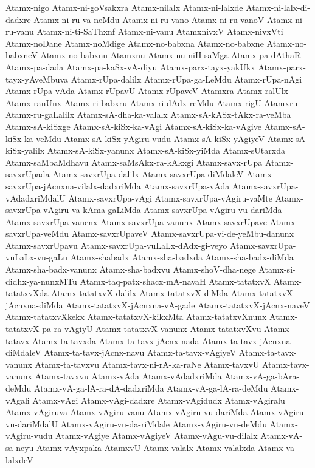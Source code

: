 {Atamx-nigo
Atamx-ni-goVsakxra
Atamx-nilalx
Atamx-ni-lalxde
Atamx-ni-lalx-di-dadxre
Atamx-ni-ru-va-neMdu
Atamx-ni-ru-vano
Atamx-ni-ru-vanoV
Atamx-ni-ru-vanu
Atamx-ni-ti-SaThxnf
Atamx-ni-vanu
AtamxnivxV
Atamx-nivxVti
Atamx-noDane
Atamx-noMdige
Atamx-no-babxna
Atamx-no-babxne
Atamx-no-babxneV
Atamx-no-babxnu
Atamxnu
Atamx-nu-niH-saMga
Atamx-pa-dAthaR
Atamx-pa-dada
Atamx-pa-kaSx-vA-diyu
Atamx-parx-tayx-yakUkx
Atamx-parx-tayx-yAveMbuva
Atamx-rUpa-dalilx
Atamx-rUpa-ga-LeMdu
Atamx-rUpa-nAgi
Atamx-rUpa-vAda
Atamx-rUpavU
Atamx-rUpaveV
Atamxra
Atamx-ralUlx
Atamx-ranUnx
Atamx-ri-babxru
Atamx-ri-dAdx-reMdu
Atamx-rigU
Atamxru
Atamx-ru-gaLalilx
Atamx-sA-dha-ka-valalx
Atamx-sA-kASx-tAkx-ra-veMba
Atamx-sA-kiSxge
Atamx-sA-kiSx-ka-vAgi
Atamx-sA-kiSx-ka-vAgive
Atamx-sA-kiSx-ka-veMdu
Atamx-sA-kiSx-yAgiru-vudu
Atamx-sA-kiSx-yAgiyeV
Atamx-sA-kiSx-yalilx
Atamx-sA-kiSx-yanunx
Atamx-sA-kiSx-yiMda
Atamx-sUtarxda
Atamx-saMbaMdhavu
Atamx-saMsAkx-ra-kAkxgi
Atamx-savx-rUpa
Atamx-savxrUpada
Atamx-savxrUpa-dalilx
Atamx-savxrUpa-diMdaleV
Atamx-savxrUpa-jAcnxna-vilalx-dadxriMda
Atamx-savxrUpa-vAda
Atamx-savxrUpa-vAdadxriMdalU
Atamx-savxrUpa-vAgi
Atamx-savxrUpa-vAgiru-vaMte
Atamx-savxrUpa-vAgiru-va-kAma-gaLiMda
Atamx-savxrUpa-vAgiru-vu-dariMda
Atamx-savxrUpa-vanenx
Atamx-savxrUpa-vanunx
Atamx-savxrUpave
Atamx-savxrUpa-veMdu
Atamx-savxrUpaveV
Atamx-savxrUpa-vi-de-yeMbu-danunx
Atamx-savxrUpavu
Atamx-savxrUpa-vuLaLx-dAdx-gi-veyo
Atamx-savxrUpa-vuLaLx-vu-gaLu
Atamx-shabadx
Atamx-sha-badxda
Atamx-sha-badx-diMda
Atamx-sha-badx-vanunx
Atamx-sha-badxvu
Atamx-shoV-dha-nege
Atamx-si-didhx-ya-nunxMTu
Atamx-taq-patx-shacx-mA-navaH
Atamx-tatatxvX
Atamx-tatatxvXda
Atamx-tatatxvX-dalilx
Atamx-tatatxvX-diMda
Atamx-tatatxvX-jAcnxna-diMda
Atamx-tatatxvX-jAcnxna-vA-gade
Atamx-tatatxvX-jAcnx-naveV
Atamx-tatatxvXkekx
Atamx-tatatxvX-kikxMta
Atamx-tatatxvXnunx
Atamx-tatatxvX-pa-ra-vAgiyU
Atamx-tatatxvX-vanunx
Atamx-tatatxvXvu
Atamx-tatavx
Atamx-ta-tavxda
Atamx-ta-tavx-jAcnx-nada
Atamx-ta-tavx-jAcnxna-diMdaleV
Atamx-ta-tavx-jAcnx-navu
Atamx-ta-tavx-vAgiyeV
Atamx-ta-tavx-vanunx
Atamx-ta-tavxvu
Atamx-tavx-ni-rA-ka-raNe
Atamx-tavxvU
Atamx-tavx-vanunx
Atamx-tavxvu
Atamx-vAda
Atamx-vAdadxriMda
Atamx-vA-ga-bAra-deMdu
Atamx-vA-ga-lA-ra-dA-dadxriMda
Atamx-vA-ga-lA-ra-deMdu
Atamx-vAgali
Atamx-vAgi
Atamx-vAgi-dadxre
Atamx-vAgidudx
Atamx-vAgiralu
Atamx-vAgiruva
Atamx-vAgiru-vanu
Atamx-vAgiru-vu-dariMda
Atamx-vAgiru-vu-dariMdalU
Atamx-vAgiru-vu-da-riMdale
Atamx-vAgiru-vu-deMdu
Atamx-vAgiru-vudu
Atamx-vAgiye
Atamx-vAgiyeV
Atamx-vAgu-vu-dilalx
Atamx-vA-sa-neyu
Atamx-vAyxpaka
AtamxvU
Atamx-valalx
Atamx-valalxda
Atamx-va-lalxdeV
}
